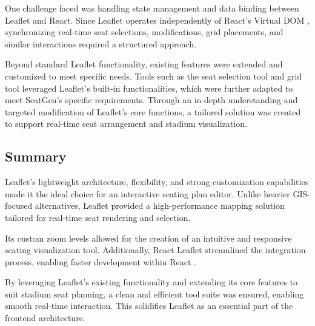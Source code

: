 One challenge faced was handling state management and data binding between Leaflet and React. Since Leaflet operates independently of React’s Virtual DOM \cite{ReactLeafletDocs}, synchronizing real-time seat selections, modifications, grid placements, and similar interactions required a structured approach.

Beyond standard Leaflet functionality, existing features were extended and customized to meet specific needs. Tools such as the seat selection tool and grid tool leveraged Leaflet’s built-in functionalities, which were further adapted to meet SeatGen’s specific requirements. Through an in-depth understanding and targeted modification of Leaflet’s core functions, a tailored solution was created to support real-time seat arrangement and stadium visualization.

\subsection{Summary}

Leaflet’s lightweight architecture, flexibility, and strong customization capabilities made it the ideal choice for an interactive seating plan editor. Unlike heavier GIS-focused alternatives, Leaflet provided a high-performance mapping solution tailored for real-time seat rendering and selection. 

Its custom zoom levels allowed for the creation of an intuitive and responsive seating visualization tool. Additionally, React Leaflet streamlined the integration process, enabling faster development within React \cite{ReactLeafletDocs}.

By leveraging Leaflet’s existing functionality and extending its core features to suit stadium seat planning, a clean and efficient tool suite was ensured, enabling smooth real-time interaction. This solidifies Leaflet as an essential part of the frontend architecture.

